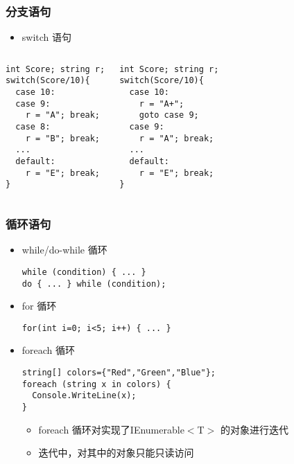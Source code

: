\begin{frame}[fragile]
\frametitle{分支语句}
  \begin{itemize}
  \item switch 语句
  \end{itemize}
  \begin{columns}
\begin{lstlisting}
int Score; string r;
switch(Score/10){
  case 10:
  case 9:
    r = "A"; break;
  case 8:
    r = "B"; break;
  ...
  default:
    r = "E"; break;
}

\end{lstlisting}
\begin{lstlisting}
int Score; string r;
switch(Score/10){
  case 10:
    r = "A+";
    goto case 9;
  case 9:
    r = "A"; break;
  ...
  default:
    r = "E"; break;
}

\end{lstlisting}
  \end{columns}
\end{frame}
\begin{frame}[fragile]
\frametitle{循环语句}
\begin{itemize}
\item while/do-while 循环
\begin{lstlisting}
while (condition) { ... }
do { ... } while (condition);
\end{lstlisting}
\item for 循环
\begin{lstlisting}
for(int i=0; i<5; i++) { ... }
\end{lstlisting}
  \pause
\item foreach 循环
\begin{lstlisting}
string[] colors={"Red","Green","Blue"};
foreach (string x in colors) {
  Console.WriteLine(x);
}
\end{lstlisting}
\begin{itemize}
\item foreach 循环对实现了IEnumerable$<$T$>$ 的对象进行迭代
\item 迭代中，对其中的对象只能只读访问
\end{itemize}
\end{itemize}
\end{frame}

